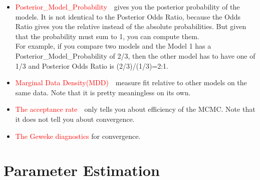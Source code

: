 \documentclass[cn,10pt,math=newtx,citestyle=gb7714-2015,bibstyle=gb7714-2015]{elegantbook}
\begin{document}
{{\begin{enumerate}
\begin{itemize}
{				\begin{itemize}
					\item to treat comparison as a decision problem, computing the expected value or cost of each model choice;
					\item to use minimum message length(MML).
				\end{itemize}
			}.
			\item \textcolor{red}{Posterior\_Model\_Probability}~~gives you the posterior probability of the models. It is not identical to the Posterior Odds Ratio, because the Odds Ratio gives you the relative instead of the absolute probabilities. But given that the probability must sum to 1, you can compute them.\\
			For example, if you compare two models and the Model 1 has a Posterior\_Model\_Probability of 2/3, then the other model has to have one of 1/3 and Posterior Odds Ratio is (2/3)/(1/3)=2:1.
			\item \textcolor{red}{Marginal Data Density(MDD)}~~measure fit relative to other models on the same data. Note that it is pretty meaningless on its own.
			\item \textcolor{red}{The acceptance rate}~~only tells you about efficiency of the MCMC. Note that it does not tell you about convergence.
			\item \textcolor{red}{The Geweke diagnostics} for convergence.
		\end{itemize}
		
	\end{enumerate}
	
	\section{Parameter Estimation}
	
}}
\end{document}

